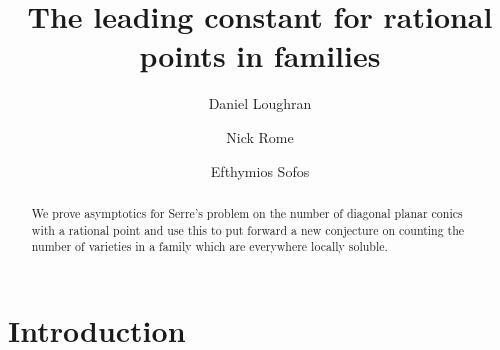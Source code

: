 \documentclass[a4paper,12pt,reqno]{amsart}
\numberwithin{equation}{section} \numberwithin{figure}{section}
\renewcommand{\#}{\sharp}
\theoremstyle{definition}
\numberwithin{lemma}{section}
\begin{document}
  
\title[Leading constant]{The leading constant for rational points in families}  



\begin{abstract}
	We prove asymptotics for Serre's problem on the number of diagonal planar conics with a rational point and use this to put forward a new conjecture on counting the number of varieties in a family which are everywhere locally soluble.
  \end{abstract}

\author{Daniel Loughran} 
  \address{
  Department of Mathematical Sciences \\
University of Bath \\
Claverton Down \\
Bath \\
BA2 7AY \\
UK}

\author{Nick Rome} 
\address{School of Mathematics
\\ University of Michigan
 \\ Ann Arbor 
 \\  MI 48109   \\  USA}   




\author{Efthymios Sofos} 
\address{
Department of Mathematics\\
University of Glasgow  \\ G12~8QQ \\ UK}






 	
\maketitle

\thispagestyle{empty}

\tableofcontents

\section{Introduction}
\end{document}
